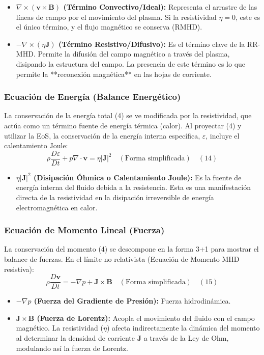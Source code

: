 \begin{itemize}
    \item \textbf{$\nabla \times (\mathbf{v} \times \mathbf{B})$ (Término Convectivo/Ideal):} Representa el arrastre de las líneas de campo por el movimiento del plasma. Si la resistividad $\eta=0$, este es el único término, y el flujo magnético se conserva (RMHD).
    \item \textbf{$-\nabla \times (\eta \mathbf{J})$ (Término Resistivo/Difusivo):} Es el término clave de la RR-MHD. Permite la difusión del campo magnético a través del plasma, disipando la estructura del campo. La presencia de este término es lo que permite la **reconexión magnética** en las hojas de corriente.
\end{itemize}

\subsubsection{Ecuación de Energía (Balance Energético)}

La conservación de la energía total (4) se ve modificada por la resistividad, que actúa como un término fuente de energía térmica (calor). Al proyectar (4) y utilizar la EoS, la conservación de la energía interna específica, $\varepsilon$, incluye el calentamiento Joule:
\begin{equation}
\rho \frac{D\varepsilon}{Dt} + p \nabla \cdot \mathbf{v} = \eta |\mathbf{J}|^2 \quad (\text{Forma simplificada}) \quad (14)
\end{equation}

\begin{itemize}
    \item \textbf{$\eta |\mathbf{J}|^2$ (Disipación Óhmica o Calentamiento Joule):} Es la fuente de energía interna del fluido debida a la resistencia. Esta es una manifestación directa de la resistividad en la disipación irreversible de energía electromagnética en calor.
\end{itemize}

\subsubsection{Ecuación de Momento Lineal (Fuerza)}

La conservación del momento (4) se descompone en la forma 3+1 para mostrar el balance de fuerzas. En el límite no relativista (Ecuación de Momento MHD resistiva):
\begin{equation}
\rho \frac{D \mathbf{v}}{Dt} = -\nabla p + \mathbf{J} \times \mathbf{B} \quad (\text{Forma simplificada}) \quad (15)
\end{equation}

\begin{itemize}
    \item \textbf{$-\nabla p$ (Fuerza del Gradiente de Presión):} Fuerza hidrodinámica.
    \item \textbf{$\mathbf{J} \times \mathbf{B}$ (Fuerza de Lorentz):} Acopla el movimiento del fluido con el campo magnético. La resistividad ($\eta$) afecta indirectamente la dinámica del momento al determinar la densidad de corriente $\mathbf{J}$ a través de la Ley de Ohm, modulando así la fuerza de Lorentz.
\end{itemize}
